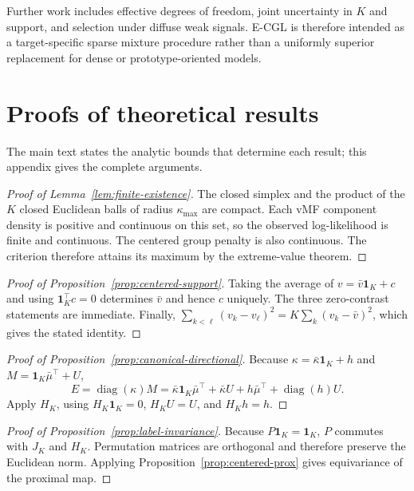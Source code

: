 \documentclass[preprint,12pt,authoryear]{elsarticle}
\begin{document}
Further work includes effective degrees of freedom, joint uncertainty in $K$
and support, and selection under diffuse weak signals. E-CGL is therefore
intended as a target-specific sparse mixture procedure rather than a uniformly
superior replacement for dense or prototype-oriented models.

\appendix
\section{Proofs of theoretical results}
\label{app:proofs}

The main text states the analytic bounds that determine each result; this
appendix gives the complete arguments.

\begin{proof}[Proof of Lemma~\ref{lem:finite-existence}]
The closed simplex and the product of the $K$ closed Euclidean balls of radius
$\kappa_{\max}$ are compact. Each vMF component density is positive and
continuous on this set, so the observed log-likelihood is finite and
continuous. The centered group penalty is also continuous. The criterion
therefore attains its maximum by the extreme-value theorem.
\end{proof}

\begin{proof}[Proof of Proposition~\ref{prop:centered-support}]
Taking the average of $v=\bar v\mathbf1_K+c$ and using
$\mathbf1_K^\top c=0$ determines $\bar v$ and hence $c$ uniquely. The three
zero-contrast statements are immediate. Finally,
$\sum_{k<\ell}(v_k-v_\ell)^2=K\sum_k(v_k-\bar v)^2$, which gives the stated
identity.
\end{proof}

\begin{proof}[Proof of Proposition~\ref{prop:canonical-directional}]
Because $\kappa=\bar\kappa\mathbf1_K+h$ and
$M=\mathbf1_K\bar\mu^\top+U$,
\[
E=\operatorname{diag}(\kappa)M
=\bar\kappa\mathbf1_K\bar\mu^\top+\bar\kappa U
+h\bar\mu^\top+\operatorname{diag}(h)U.
\]
Apply $H_K$, using $H_K\mathbf1_K=0$, $H_KU=U$, and $H_Kh=h$.
\end{proof}

\begin{proof}[Proof of Proposition~\ref{prop:label-invariance}]
Because $P\mathbf1_K=\mathbf1_K$, $P$ commutes with $J_K$ and $H_K$.
Permutation matrices are orthogonal and therefore preserve the Euclidean
norm. Applying Proposition~\ref{prop:centered-prox} gives equivariance of the
proximal map.
\end{proof}
\end{document}
